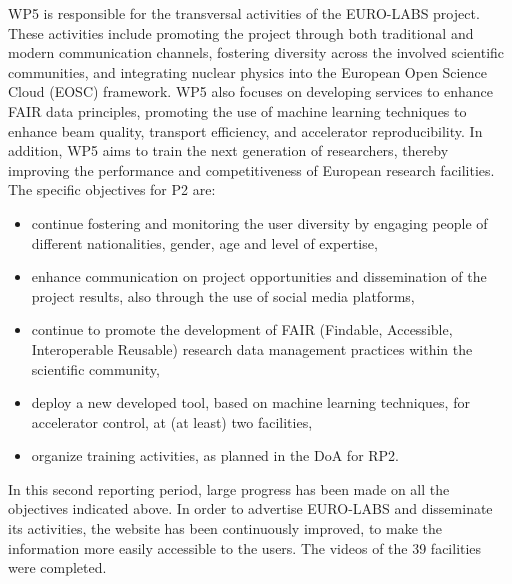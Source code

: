  WP5 
 is responsible for the transversal activities of the EURO-LABS project. These activities include promoting the project through both traditional and modern communication channels, fostering diversity across the involved scientific communities, and integrating nuclear physics into the European Open Science Cloud (EOSC) framework. WP5 also focuses on developing services to enhance FAIR data principles, promoting the use of machine learning techniques to enhance beam quality, transport efficiency, and accelerator reproducibility. In addition, WP5 aims to train the next generation of researchers, thereby improving the performance and competitiveness of European research facilities.
 The specific objectives for P2 are: 
\begin{itemize}
    \item continue fostering and monitoring the user diversity by engaging people of different nationalities, gender, age and level of expertise,
    \item enhance communication on project opportunities and dissemination of the project results, also through the use of social media platforms,
    \item continue to promote the development of FAIR (Findable, Accessible, Interoperable Reusable) research data management practices within the scientific community,
    \item deploy a  new developed tool, based on machine learning techniques, for accelerator control, at (at least) two facilities,
    \item organize training activities, as planned in the DoA for RP2.
\end{itemize}
In this second reporting period, large progress has been made on all the objectives indicated above. In order to advertise EURO-LABS and disseminate its activities, the website has been continuously improved, to make the information more easily accessible to the users.  
The videos of the  39 facilities were completed. 
